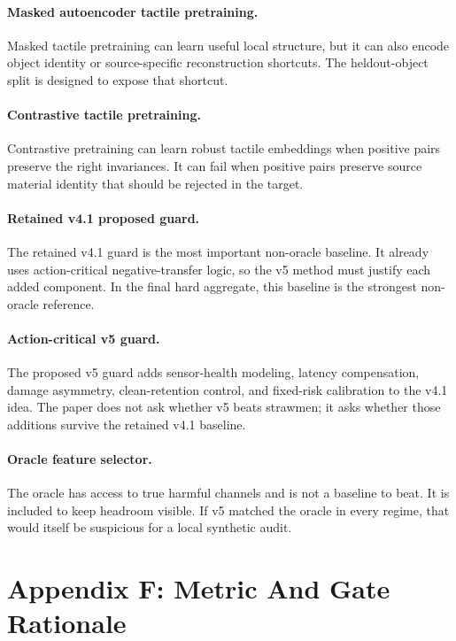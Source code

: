 \documentclass{article}
\begin{document}
\paragraph{Masked autoencoder tactile pretraining.}
Masked tactile pretraining can learn useful local structure, but it can also encode object identity or source-specific reconstruction shortcuts. The heldout-object split is designed to expose that shortcut.

\paragraph{Contrastive tactile pretraining.}
Contrastive pretraining can learn robust tactile embeddings when positive pairs preserve the right invariances. It can fail when positive pairs preserve source material identity that should be rejected in the target.

\paragraph{Retained v4.1 proposed guard.}
The retained v4.1 guard is the most important non-oracle baseline. It already uses action-critical negative-transfer logic, so the v5 method must justify each added component. In the final hard aggregate, this baseline is the strongest non-oracle reference.

\paragraph{Action-critical v5 guard.}
The proposed v5 guard adds sensor-health modeling, latency compensation, damage asymmetry, clean-retention control, and fixed-risk calibration to the v4.1 idea. The paper does not ask whether v5 beats strawmen; it asks whether those additions survive the retained v4.1 baseline.

\paragraph{Oracle feature selector.}
The oracle has access to true harmful channels and is not a baseline to beat. It is included to keep headroom visible. If v5 matched the oracle in every regime, that would itself be suspicious for a local synthetic audit.

\clearpage
\section{Appendix F: Metric And Gate Rationale}
\end{document}
